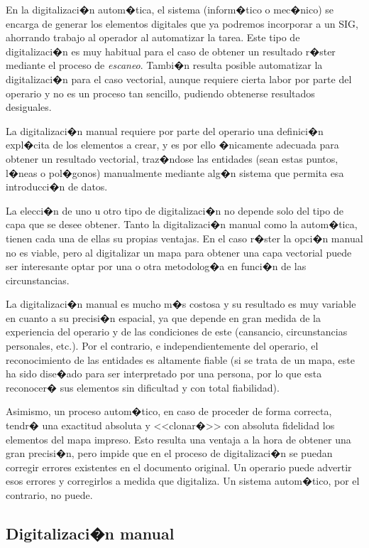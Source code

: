 
En la digitalizaci�n autom�tica, el sistema (inform�tico o mec�nico) se encarga de generar los elementos digitales que ya podremos incorporar a un SIG, ahorrando trabajo al operador al automatizar la tarea. Este tipo de digitalizaci�n es muy habitual para el caso de obtener un resultado r�ster mediante el proceso de \emph{escaneo}. Tambi�n resulta posible automatizar la digitalizaci�n para el caso vectorial, aunque requiere cierta labor por parte del operario y no es un proceso tan sencillo, pudiendo obtenerse resultados desiguales. 

La digitalizaci�n manual requiere por parte del operario una definici�n expl�cita de los elementos a crear, y es por ello �nicamente adecuada para obtener un resultado vectorial, traz�ndose las entidades (sean estas puntos, l�neas o pol�gonos) manualmente mediante alg�n sistema que permita esa introducci�n de datos. 

La elecci�n de uno u otro tipo de digitalizaci�n no depende solo del tipo de capa que se desee obtener. Tanto la digitalizaci�n manual como la autom�tica, tienen cada una de ellas su propias ventajas. En el caso r�ster la opci�n manual no es viable, pero al digitalizar un mapa para obtener una capa vectorial puede ser interesante optar por una o otra metodolog�a en funci�n de las circunstancias. 

La digitalizaci�n manual es mucho m�s costosa y su resultado es muy variable en cuanto a su precisi�n espacial, ya que depende en gran medida de la experiencia del operario y de las condiciones de este (cansancio, circunstancias personales, etc.). Por el contrario, e independientemente del operario, el reconocimiento de las entidades es altamente fiable (si se trata de un mapa, este ha sido dise�ado para ser interpretado por una persona, por lo que esta reconocer� sus elementos sin dificultad y con total fiabilidad). 

Asimismo, un proceso autom�tico, en caso de proceder de forma correcta, tendr� una exactitud absoluta y <<clonar�>> con absoluta fidelidad los elementos del mapa impreso. Esto resulta una ventaja a la hora de obtener una gran precisi�n, pero impide que en el proceso de digitalizaci�n se puedan corregir errores existentes en el documento original. Un operario puede advertir esos errores y corregirlos a medida que digitaliza. Un sistema autom�tico, por el contrario, no puede.
 
\subsection{Digitalizaci�n manual}
\label{Digitalizacion_manual}

